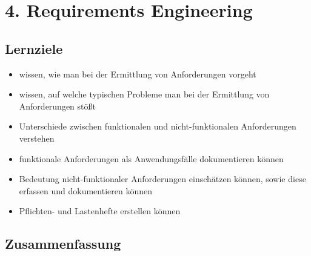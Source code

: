 \section*{4. Requirements Engineering}

\subsection*{Lernziele}
\begin{itemize}
    \item wissen, wie man bei der Ermittlung von Anforderungen vorgeht
    \item wissen, auf welche typischen Probleme man bei der Ermittlung von Anforderungen stößt
    \item Unterschiede zwischen funktionalen und nicht-funktionalen Anforderungen verstehen
    \item funktionale Anforderungen als Anwendungsfälle dokumentieren können
    \item Bedeutung nicht-funktionaler Anforderungen einschätzen können, sowie diese erfassen und dokumentieren können
    \item Pflichten- und Lastenhefte erstellen können
\end{itemize}

\subsection*{Zusammenfassung}

